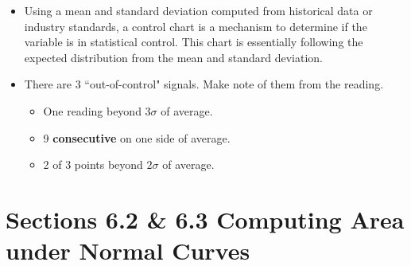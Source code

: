 \begin{enumerate}
\begin{itemize}
                \item Using a mean and standard deviation computed from historical data or industry standards, a control chart is a mechanism to determine if the variable is in statistical control. This chart is essentially following the expected distribution from the mean and standard deviation.
                
                \item There are 3 ``out-of-control" signals. Make note of them from the reading.
                
                    \begin{itemize}
                    
                        \item One reading beyond $3\sigma$ of average.
                        
                        \item 9 \textbf{consecutive} on one side of average.
                        
                        \item 2 of 3 points beyond $2\sigma$ of average.
                        
                    \end{itemize}
                    
            \end{itemize}
            
    \end{enumerate}

\newpage

\section*{Sections 6.2 \& 6.3 Computing Area under Normal Curves}

